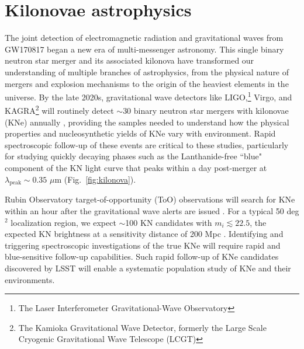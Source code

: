 \documentclass[11pt,a4paper,twoside,onecolumn,openany,final,oldfontcommands]{memoir}
\begin{document}



\section{Kilonovae astrophysics}

The joint detection of electromagnetic radiation and gravitational waves from GW170817 began a new era of multi-messenger astronomy.  This single binary neutron star merger and its associated kilonova have transformed our understanding of multiple branches of astrophysics, from the physical nature of mergers and explosion mechanisms to the origin of the heaviest elements in the universe.  By the late 2020s, gravitational wave detectors like LIGO,\footnote{The Laser Interferometer Gravitational-Wave Observatory} Virgo, and KAGRA\footnote{The Kamioka Gravitational Wave Detector, formerly the Large Scale Cryogenic Gravitational Wave Telescope (LCGT)} will routinely detect $\sim$30 binary neutron star mergers with kilonovae (KNe) annually \citep{abbott2018prospects}, providing the samples needed to understand how the physical properties and nucleosynthetic yields of KNe vary with environment.  Rapid spectroscopic follow-up of these events are critical to these studies, particularly for studying quickly decaying phases such as the Lanthanide-free ``blue" component of the KN light curve that peaks within a day post-merger at $\lambda_\mathrm{peak}\sim0.35$ $\mu$m (Fig.~\ref{fig:kilonova}).

Rubin Observatory target-of-opportunity (ToO) observations will search for KNe within an hour after the gravitational wave alerts are issued \citep[assuming the strategy proposed by][]{margutti2018}. For a typical 50 deg$^2$ localization region, we expect $\sim$100 KN candidates with $m_i\lesssim22.5$, the expected KN brightness at a sensitivity distance of 200 Mpc \citep{cowperthwaite2017, goldstein2019}. Identifying and triggering spectroscopic investigations of the true KNe will require rapid and blue-sensitive follow-up capabilities. Such rapid follow-up of KNe candidates discovered by LSST will enable a systematic population study of KNe and their environments.
\end{document}
